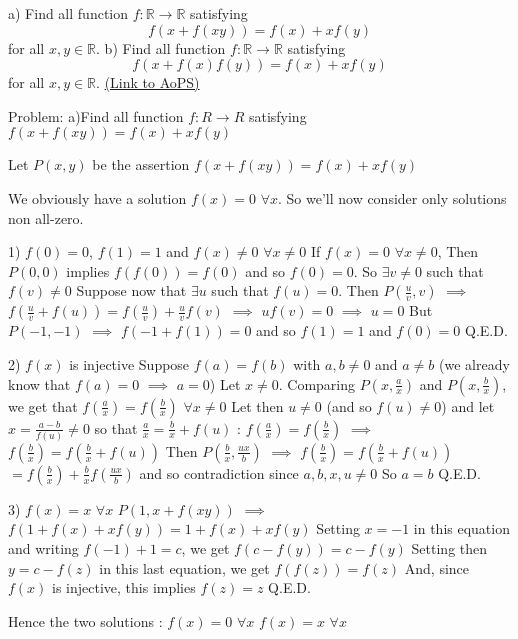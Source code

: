 \begin{problem}
	a) Find all function $f: \mathbb R \to \mathbb R$ satisfying \[ f(x+f(xy))=f(x)+xf(y)\] for all $x,y \in \mathbb R$.
b) Find all function $f: \mathbb R \to \mathbb R$ satisfying \[f(x+f(x)f(y))=f(x)+xf(y)\] for all $x,y \in \mathbb R$.
	\flushright \href{https://artofproblemsolving.com/community/c6h292835}{(Link to AoPS)}
\end{problem}



\begin{solution}
	\begin{tcolorbox}Problem:
a)Find all function $ f: R \to R$ satisfying $ f(x + f(xy)) = f(x) + xf(y)$
\end{tcolorbox}

Let $ P(x,y)$ be the assertion $ f(x+f(xy))=f(x)+xf(y)$

We obviously have a solution $ f(x)=0$ $ \forall x$. So we'll now consider only solutions non all-zero.

1) $ f(0)=0$, $ f(1)=1$ and $ f(x)\neq 0$ $ \forall x\neq 0$
If $ f(x)=0$ $ \forall x\neq 0$, Then $ P(0,0)$ implies $ f(f(0))=f(0)$ and so $ f(0)=0$. So $ \exists v\neq 0$ such that $ f(v)\neq 0$
Suppose now that $ \exists u$ such that $ f(u)=0$. Then $ P(\frac uv,v)$ $ \implies$ $ f(\frac uv+f(u))=f(\frac uv) +\frac uvf(v)$ $ \implies$ $ uf(v)=0$ $ \implies$ $ u=0$
But $ P(-1,-1)$ $ \implies$ $ f(-1+f(1))=0$ and so $ f(1)=1$ and $ f(0)=0$
Q.E.D.

2) $ f(x)$ is injective
Suppose $ f(a)=f(b)$ with $ a,b\neq 0$ and $ a\neq b$ (we already know that $ f(a)=0$ $ \implies$ $ a=0$)
Let $ x\neq 0$. Comparing $ P(x,\frac ax)$ and $ P(x,\frac bx)$, we get that $ f(\frac ax)=f(\frac bx)$ $ \forall x\neq 0$
Let then $ u\neq 0$ (and so $ f(u)\neq 0$) and let $ x=\frac {a-b}{f(u)}\neq 0$  so that $ \frac ax=\frac bx + f(u)$ :
$ f(\frac ax)=f(\frac bx)$ $ \implies$ $ f(\frac bx)=f(\frac bx+f(u))$
Then $ P(\frac bx,\frac{ux}b)$ $ \implies$ $ f(\frac bx)=f(\frac bx+f(u))$ $ =f(\frac bx)+\frac bxf(\frac {ux}{b})$ and so contradiction since $ a,b,x,u\neq 0$
So $ a=b$
Q.E.D.

3) $ f(x)=x$ $ \forall x$
$ P(1,x+f(xy))$ $ \implies$ $ f(1+f(x)+xf(y))=1+f(x)+xf(y)$
Setting $ x=-1$ in this equation and writing $ f(-1)+1=c$, we get $ f(c-f(y))=c-f(y)$
Setting then $ y=c-f(z)$ in this last equation, we get $ f(f(z))=f(z)$
And, since $ f(x)$ is injective, this implies $ f(z)=z$
Q.E.D.

Hence the two solutions :
$ f(x)=0$ $ \forall x$
$ f(x)=x$ $ \forall x$
\end{solution}



